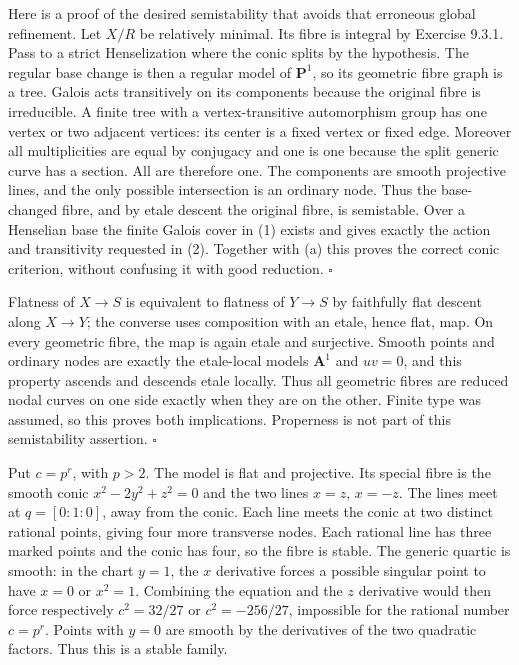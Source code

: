 \documentclass[11pt]{article}
\let\chapterexercise\exercise
\renewcommand{\exercise}[2]{\Needspace{8\baselineskip}\chapterexercise{#1}{#2}}
\begin{document}
Here is a proof of the desired semistability that avoids that erroneous global refinement. Let $X/R$ be relatively minimal. Its fibre is integral by Exercise 9.3.1. Pass to a strict Henselization where the conic splits by the hypothesis. The regular base change is then a regular model of $\mathbf P^1$, so its geometric fibre graph is a tree. Galois acts transitively on its components because the original fibre is irreducible. A finite tree with a vertex-transitive automorphism group has one vertex or two adjacent vertices: its center is a fixed vertex or fixed edge. Moreover all multiplicities are equal by conjugacy and one is one because the split generic curve has a section. All are therefore one. The components are smooth projective lines, and the only possible intersection is an ordinary node. Thus the base-changed fibre, and by etale descent the original fibre, is semistable. Over a Henselian base the finite Galois cover in (1) exists and gives exactly the action and transitivity requested in (2). Together with (a) this proves the correct conic criterion, without confusing it with good reduction. \hfill$\square$

\pf Flatness of $X\to S$ is equivalent to flatness of $Y\to S$ by faithfully flat descent along $X\to Y$; the converse uses composition with an etale, hence flat, map. On every geometric fibre, the map is again etale and surjective. Smooth points and ordinary nodes are exactly the etale-local models $\mathbf A^1$ and $uv=0$, and this property ascends and descends etale locally. Thus all geometric fibres are reduced nodal curves on one side exactly when they are on the other. Finite type was assumed, so this proves both implications. Properness is not part of this semistability assertion. \hfill$\square$

\pf Put $c=p^r$, with $p>2$. The model is flat and projective. Its special fibre is the smooth conic $x^2-2y^2+z^2=0$ and the two lines $x=z$, $x=-z$. The lines meet at $q=[0:1:0]$, away from the conic. Each line meets the conic at two distinct rational points, giving four more transverse nodes. Each rational line has three marked points and the conic has four, so the fibre is stable. The generic quartic is smooth: in the chart $y=1$, the $x$ derivative forces a possible singular point to have $x=0$ or $x^2=1$. Combining the equation and the $z$ derivative would then force respectively $c^2=32/27$ or $c^2=-256/27$, impossible for the rational number $c=p^r$. Points with $y=0$ are smooth by the derivatives of the two quadratic factors. Thus this is a stable family.
\end{document}
